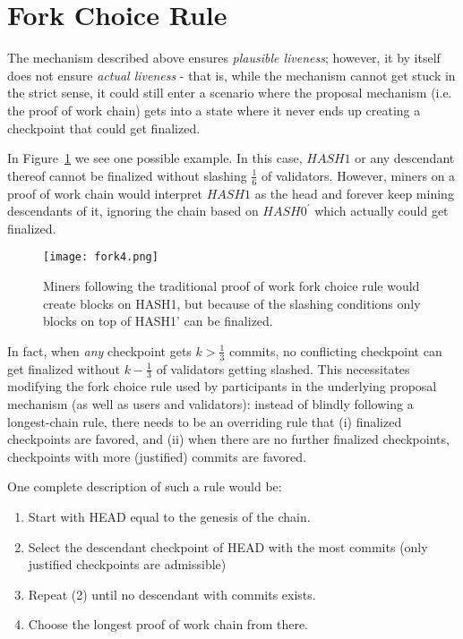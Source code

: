 \documentclass[12pt, final]{article}
\newcommand{\figref}[1]{Figure~\ref{#1}}
\begin{document}
\section{Fork Choice Rule}
\label{sect:forkchoice}

The mechanism described above ensures \textit{plausible liveness}; however, it by itself does not ensure \textit{actual liveness} - that is, while the mechanism cannot get stuck in the strict sense, it could still enter a scenario where the proposal mechanism (i.e. the proof of work chain) gets into a state where it never ends up creating a checkpoint that could get finalized.

In \figref{fig:forkchoice} we see one possible example.  In this case, $HASH1$ or any descendant thereof cannot be finalized without slashing $\frac{1}{6}$ of validators. However, miners on a proof of work chain would interpret $HASH1$ as the head and forever keep mining descendants of it, ignoring the chain based on $HASH0^\prime$ which actually could get finalized.

\begin{figure}[h!tb]
\centering
\texttt{[image: fork4.png]}
\caption{Miners following the traditional proof of work fork choice rule would create blocks on HASH1, but because of the slashing conditions only blocks on top of HASH1' can be finalized.}
\label{fig:forkchoice}
\end{figure}

In fact, when \textit{any} checkpoint gets $k > \frac{1}{3}$ commits, no conflicting checkpoint can get finalized without $k - \frac{1}{3}$ of validators getting slashed. This necessitates modifying the fork choice rule used by participants in the underlying proposal mechanism (as well as users and validators): instead of blindly following a longest-chain rule, there needs to be an overriding rule that (i) finalized checkpoints are favored, and (ii) when there are no further finalized checkpoints, checkpoints with more (justified) commits are favored.

One complete description of such a rule would be:

\begin{enumerate}
\item Start with HEAD equal to the genesis of the chain.
\item Select the descendant checkpoint of HEAD with the most commits (only justified checkpoints are admissible)
\item Repeat (2) until no descendant with commits exists.
\item Choose the longest proof of work chain from there.
\end{enumerate}
\end{document}
